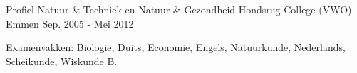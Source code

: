 \begin{cventries}
  \cventry
    {Profiel Natuur \& Techniek en Natuur \& Gezondheid} %
    {Hondsrug College (VWO)} %
    {Emmen} %
    {Sep. 2005 - Mei 2012} %
    {
      \begin{cvitems} %
        \item {Examenvakken: Biologie, Duits, Economie, Engels, Natuurkunde, Nederlands, Scheikunde, Wiskunde B. }
      \end{cvitems}
    }

\end{cventries}
